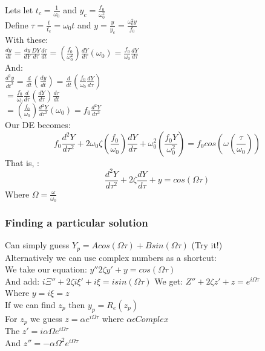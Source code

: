 \documentclass[12pt]{article}
\begin{document}
	Lets let $t_c = \frac{1}{\omega_0}$ and $y_c = \frac{f_0}{\omega_0^2}$\\
	Define $\tau = \frac{t}{t_c} = \omega_0 t$ and $y = \frac{y}{y_c} = \frac{\omega_0^2 y}{f_0}$\\
	
	With these:\\
	$\frac{dy}{dt} = \frac{dy}{dY} \frac{DY}{d\tau}\frac{d\tau}{dt} = (\frac{f_0}{\omega_0^2})\frac{dY}{d\tau}(\omega_0) = \frac{f_0}{\omega_0}\frac{dY}{d\tau}$\\
	And:\\
	$\frac{d^2y}{dt^2} = \frac{d}{dt}(\frac{dy}{dt}) = \frac{d}{dt}(\frac{f_0}{\omega_0}\frac{dY}{d\tau})$\\
	$= \frac{f_0}{\omega_0}\frac{d}{d\tau}(\frac{dY}{d\tau})\frac{d\tau}{dt}$\\
	$= (\frac{f_0}{\omega_0})\frac{d^2Y}{d\tau^2}(\omega_0) = f_0\frac{d^2Y}{d\tau^2}$\\
	
	Our DE becomes:\\
	$$f_0\frac{d^2Y}{d\tau^2} + 2\omega_0\zeta(\frac{f_0}{\omega_0})\frac{dY}{d\tau} + \omega_0^2(\frac{f_0Y}{\omega_0^2}) = f_0 cos(\omega(\frac{\tau}{\omega_0}))$$
	That is, :\\
	$$\frac{d^2Y}{d\tau^2} + 2\zeta \frac{dY}{d\tau} + y = cos(\Omega\tau)$$
	Where $\Omega = \frac{\omega}{\omega_0}$\\
	
	\subsubsection*{Finding a particular solution}
	Can simply guess $Y_p = Acos(\Omega\tau) + Bsin(\Omega\tau)$ (Try it!)\\
	Alternatively we can use complex numbers as a shortcut:\\
	We take our equation: $y'' 2\zeta y' + y = cos(\Omega\tau)$\\
	And add: $i\Xi'' + 2\zeta i \xi' + i\xi = isin(\Omega\tau)$
	We get: $Z'' + 2\zeta z' + z = e^{i\Omega\tau}$\\
	Where $y = i \xi = z$\\
	
	If we can find $z_p$ then $y_p = R_e(z_p)$\\
	
	For $z_p$ we guess $z = \alpha e^{i\Omega\tau}$ where $\alpha \epsilon Complex$\\
	The $z' = i\alpha \Omega e^{i\Omega\tau}$\\
	And $z'' = -\alpha\Omega^2e^{i\Omega\tau}$\\
	
\end{document}
